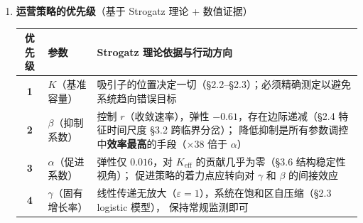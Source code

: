 \documentclass[12pt,a4paper]{article}
\begin{document}
\begin{enumerate}[label=\textbf{\arabic*.}]
\item \textbf{运营策略的优先级}（基于 Strogatz 理论 + 数值证据）

\begin{center}
\begin{tabular}{clp{8cm}}
\toprule
优先级 & 参数 & Strogatz 理论依据与行动方向 \\
\midrule
\textbf{1} & $K$（基准容量） &
吸引子的位置决定一切（\S2.2--\S2.3）；必须精确测定以避免系统趋向错误目标 \\

\textbf{2} & $\beta$（抑制系数） &
控制 $r$（收敛速率），弹性 $-0.61$，存在边际递减（\S2.4 特征时间尺度 \S3.2 跨临界分岔）；
降低抑制是所有参数调控中\textbf{效率最高}的手段（$\times 38$ 倍于 $\alpha$） \\

\textbf{3} & $\alpha$（促进系数） &
弹性仅 $0.016$，对 $K_{\text{eff}}$ 的贡献几乎为零（\S3.6 结构稳定性视角）；
促进策略的着力点应转向对 $\gamma$ 和 $\beta$ 的间接效应 \\

\textbf{4} & $\gamma$（固有增长率） &
线性传递无放大（$\varepsilon = 1$），系统在饱和区自压缩（\S2.3 logistic 模型），
保持常规监测即可 \\

\bottomrule
\end{tabular}
\end{center}

\end{enumerate}

\vspace{12pt}

\begin{center}
\end{center}
\end{document}
